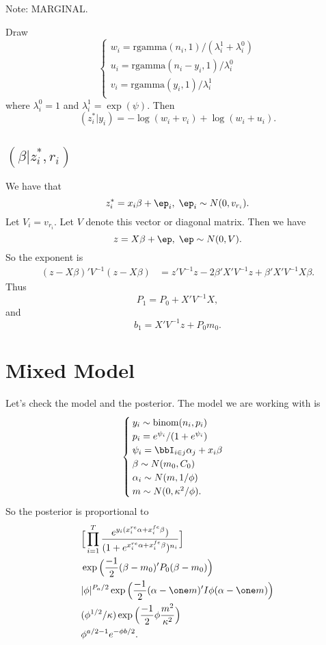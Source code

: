 \documentclass[]{article}
\begin{document}
Note: MARGINAL.

Draw
\[
\begin{cases}
w_i = \text{rgamma}(n_i, 1) / (\lambda_i^1 + \lambda_i^0) \\
u_i = \text{rgamma}(n_i - y_i, 1) / \lambda_i^0 \\
v_i = \text{rgamma}(y_i, 1) / \lambda_i^1 \\
\end{cases}
\]
where $\lambda_i^0 = 1$ and $\lambda_i^1 = \exp(\psi)$.  Then
\[
(z_i^*|y_i) = - \log(w_i + v_i) + \log(w_i + u_i).
\]

\subsection{$(\beta | z_i^*, r_i)$}

We have that
\[
z_i^* = x_i \beta + \ep_i, \; \ep_i \sim N(0, v_{r_i}).
\]
Let $V_i = v_{r_i}$.  Let $V$ denote this vector or diagonal matrix.  Then we
have
\[
z = X \beta + \ep, \; \ep \sim N(0, V).
\]
So the exponent is 
\begin{align*}
(z - X \beta)' V^{-1} (z - X \beta) & = 
z' V^{-1} z - 2 \beta' X' V^{-1} z + \beta' X' V^{-1} X \beta.
\end{align*}
Thus
\[
P_1 = P_0 + X' V^{-1} X,
\]
and
\[
b_1 = X' V^{-1} z + P_0 m_0.
\]



\section{Mixed Model}

Let's check the model and the posterior.  The model we are working with is
\[
\begin{cases}
y_i \sim \text{binom}(n_i, p_i) \\
p_i = e^{\psi_i} / (1 + e^{\psi_i}) \\
\psi_i = \bbI_{i \in j} \alpha_j + x_i \beta \\
\beta \sim N(m_0, C_0) \\
\alpha_i \sim N(m, 1/\phi) \\
m \sim N(0, \kappa^2 / \phi).
\end{cases}
\]
So the posterior is proportional to
\begin{align*}
& \Big[ \prod_{i=1}^T \frac{{e^{y_i (x_i^{re} \alpha + x_i^{fe} \beta})}}
  {(1+e^{x_i^{re} \alpha + x_i^{fe} \beta})^{n_i}} \Big] \\
& \exp \Big( \frac{-1}{2} (\beta-m_0)' P_0 (\beta-m_0) \Big) \\
& |\phi|^{P_a/2} \exp \Big( \frac{-1}{2} (\alpha - \one m)' I \phi (\alpha -
\one m) \Big) \\
& (\phi^{1/2} / \kappa) \exp \Big( \frac{-1}{2} \phi \frac{m^2}{\kappa^2} \Big) \\
& \phi^{a/2-1} e^{- \phi b / 2}.
\end{align*}
\end{document}
